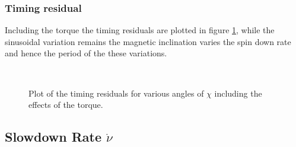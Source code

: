 \documentclass[11pt]{article}
\numberwithin{equation}{section}
\numberwithin{figure}{section}
\numberwithin{table}{section}
\begin{document}
\FloatBarrier
\subsubsection{Timing residual}
Including the torque the timing residuals are plotted in figure \ref{fig:TR with torque}, while the sinusoidal variation remains the magnetic inclination varies the spin down rate and hence the period of the these variations.
\begin{figure}[ht]
\centering
	 \\

\caption{Plot of the timing residuals for various angles of $\chi$ including the effects of the torque. }
\label{fig:TR with torque}
\end{figure}

\FloatBarrier
\subsection{Slowdown Rate $\dot{\nu}$}
\end{document}
